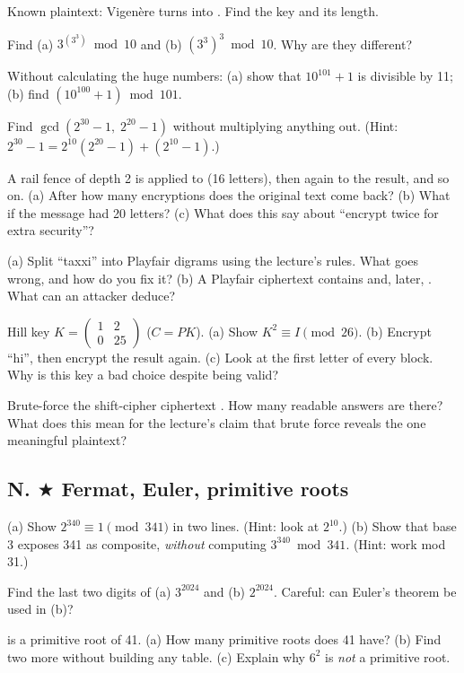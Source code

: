 \q Known plaintext: Vigen\`ere turns  into . Find the key and its length.

\q Find (a) $3^{(3^3)} \bmod 10$ and (b) $(3^3)^3 \bmod 10$. Why are they different?

\q Without calculating the huge numbers: (a) show that $10^{101} + 1$ is divisible by 11; (b) find $(10^{100} + 1) \bmod 101$.

\q Find $\gcd(2^{30} - 1,\; 2^{20} - 1)$ without multiplying anything out.
(Hint: $2^{30} - 1 = 2^{10}(2^{20} - 1) + (2^{10} - 1)$.)

\q A rail fence of depth 2 is applied to  (16 letters), then again to the result, and so on.
(a) After how many encryptions does the original text come back? (b) What if the message had 20 letters?
(c) What does this say about ``encrypt twice for extra security''?

\q (a) Split ``taxxi'' into Playfair digrams using the lecture's rules. What goes wrong, and how do you fix it?
(b) A Playfair ciphertext contains  and, later, . What can an attacker deduce?

\q Hill key $K = \begin{pmatrix}1&2\\0&25\end{pmatrix}$ ($C = PK$).
(a) Show $K^2 \equiv I \pmod{26}$. (b) Encrypt ``hi'', then encrypt the result again.
(c) Look at the first letter of every block. Why is this key a bad choice despite being valid?

\q Brute-force the shift-cipher ciphertext . How many readable answers are there? What does this mean for the lecture's claim that brute force reveals the one meaningful plaintext?


\subsection*{N. $\bigstar$ Fermat, Euler, primitive roots}

\q (a) Show $2^{340} \equiv 1 \pmod{341}$ in two lines. (Hint: look at $2^{10}$.)
(b) Show that base 3 exposes 341 as composite, \emph{without} computing $3^{340} \bmod 341$. (Hint: work mod 31.)

\q Find the last two digits of (a) $3^{2024}$ and (b) $2^{2024}$. Careful: can Euler's theorem be used in (b)?

 is a primitive root of 41. (a) How many primitive roots does 41 have? (b) Find two more without building any table. (c) Explain why $6^2$ is \emph{not} a primitive root.

